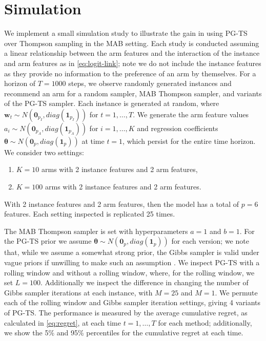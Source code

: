 \documentclass[12pt]{article}
\begin{document}
\section{Simulation} \label{sec:simulation}

We implement a small simulation study to illustrate the gain in using PG-TS over 
Thompson sampling in the MAB setting.
Each study is conducted assuming a linear relationship between the arm features
and the interaction of the instance and arm features as in \eqref{eq:logit-link}; 
note we do not include the instance features as they provide no information to 
the preference of an arm by themselves.
For a horizon of $T = 1000$ steps, we observe randomly generated instances and 
recommend an arm for a random sampler, MAB Thompson sampler, and variants of the
PG-TS sampler.
Each instance is generated at random, where 
$\bm{w}_t \sim N(\bm{0}_{p_I}, diag(\bm{1}_{p_I}))$
for $t = 1 , \ldots, T$.
We generate the arm feature values 
$a_i \sim N(\bm{0}_{p_A}, diag(\bm{1}_{p_A}))$ 
for $i = 1, \ldots, K$ and 
regression coefficients 
$\bm{\theta} \sim N(\bm{0}_p, diag(\bm{1}_p))$ 
at time $t = 1$, which persist for the entire time horizon.
We consider two settings: 
\begin{enumerate}
    \item $K = 10$ arms with 2 instance features and 2 arm features,
    \item $K = 100$ arms with 2 instance features and 2 arm features.
\end{enumerate}
With 2 instance features and 2 arm features, then the model has a total of $p = 6$
features.
Each setting inspected is replicated 25 times.

The MAB Thompson sampler is set with hyperparameters $a = 1$ and $b = 1$.
For the PG-TS prior we assume
$\bm{\theta} \sim N(\bm{0}_p, diag(\bm{1}_p))$
for each version; we note that, while we assume a somewhat strong prior, the
Gibbs sampler is valid under vague priors if unwilling to make such an assumption
\cite{choi2017analysis}.
We inspect PG-TS with a rolling window and without a rolling window, where, for 
the rolling window, we set $L = 100$.
Additionally we inspect the difference in changing the number of Gibbs sampler
iterations at each instance, with $M = 25$ and $M = 1$.
We permute each of the rolling window and Gibbs sampler iteration settings, 
giving 4 variants of PG-TS.
The performance is measured by the average cumulative regret, as calculated in 
\eqref{eq:regret}, at each time $t = 1, \ldots, T$ for each method; additionally,
we show the 5\% and 95\% percentiles for the cumulative regret at each time.
\end{document}
